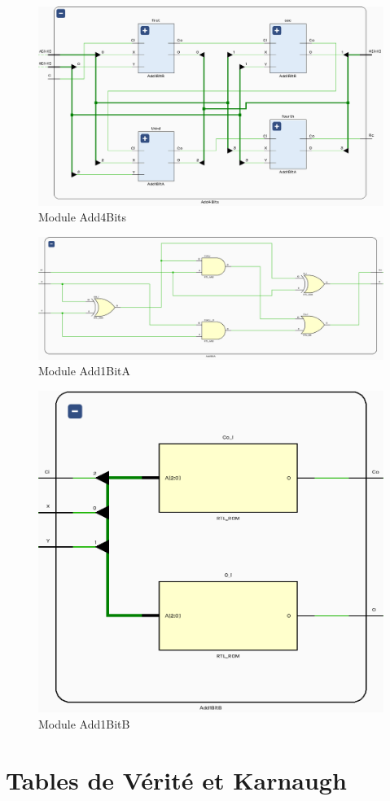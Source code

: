 \begin{figure}[H]
	\centering
	\includegraphics[width=.6\textwidth]{assets/img/schematic-add4bits.png}
	\caption{Module Add4Bits}
\end{figure}

\begin{figure}[H]
	\centering
	\includegraphics[width=.6\textwidth]{assets/img/schematic-add1bita.png}
	\caption{Module Add1BitA}
\end{figure}

\begin{figure}[H]
	\centering
	\includegraphics[width=.6\textwidth]{assets/img/schematic-add1bitb.png}
	\caption{Module Add1BitB}
\end{figure}


\newpage
\section{Tables de Vérité et Karnaugh}



